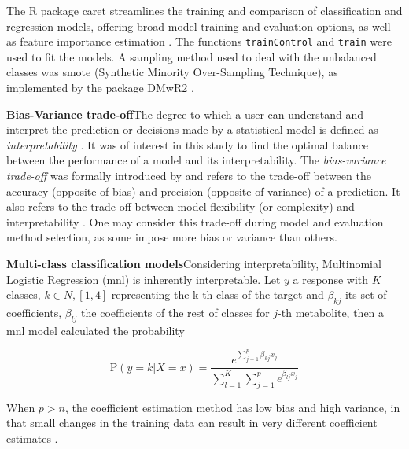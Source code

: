 \documentclass{amsart}
\begin{document}
The R package \textsf{caret} streamlines the training and comparison of classification and regression models, offering broad model training and evaluation options, as well as feature importance estimation \cite{Kuhn2008BuildingPackage}. The functions \texttt{trainControl} and \texttt{train} were used to fit the models. A sampling method used to deal with the unbalanced classes was \acrshort{smote} (Synthetic Minority Over-Sampling Technique), as implemented by the package \textsf{DMwR2} \cite{DMwR2}.

\leavevmode\newline \textbf{Bias-Variance trade-off}\hspace{.25cm}The degree to which a user can understand and interpret the prediction or decisions made by a statistical model is defined as \textit{interpretability} \cite{Elshawi2019OnHypertension}. It was of interest in this study to find the optimal balance between the performance of a model and its interpretability. The \textit{bias-variance trade-off} was formally introduced by \citeauthor{Geman1992NeuralDilemma} and refers to the trade-off between the accuracy (opposite of bias) and precision (opposite of variance) of a prediction. It also refers to the trade-off between model flexibility (or complexity) and interpretability \cite{Geman1992NeuralDilemma}. One may consider this trade-off during model and evaluation method selection, as some impose more bias or variance than others.

\leavevmode\newline \textbf{Multi-class classification models}\hspace{.25cm}Considering interpretability, Multinomial Logistic Regression (\acrshort{mnl}) is inherently interpretable. Let $y$ a response with $K$ classes, $k \in N, [1,4]$ representing the k-th class of the target and $\beta_{kj}$ its set of coefficients,  $\beta_{lj}$ the coefficients of the rest of classes for $j$-th metabolite, then a \acrlong{mnl} model calculated the probability

\[\textrm{P}(y=k|X=x) =  \dfrac{e^{\sum_{j=1}^{p}\beta_{kj}x_j}}{\sum_{l=1}^{K}\sum_{j=1}^{p}e^{\beta_{lj}x_j}}\]

When $p > n$, the coefficient estimation method has low bias and high variance, in that small changes in the training data can result in very different coefficient estimates \cite{James2023AnEdition}. 
\end{document}
